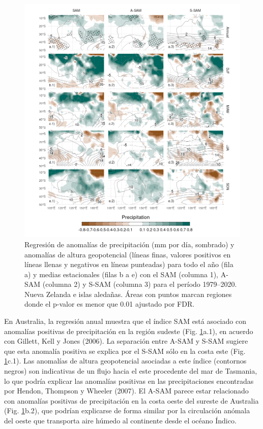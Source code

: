 \documentclass[12pt,oneside,a4paper]{reedthesis}
\begin{document}
\begin{figure}

{\centering \includegraphics{figures/30-sam/pp-regr-oceania-1} 

}

\caption{Regresión de anomalías de precipitación (mm por día, sombrado) y anomalías de altura geopotencial (líneas finas, valores positivos en líneas llenas y negativos en líneas punteadas) para todo el año (fila a) y medias estacionales (filas b a e) con el SAM (columna 1), A-SAM (columna 2) y S-SAM (columna 3) para el período 1979--2020. Nueva Zelanda e islas aledañas. Áreas con puntos marcan regiones donde el p-valor es menor que 0.01 ajustado por FDR.}\label{fig:pp-regr-oceania}
\end{figure}

En Australia, la regresión anual muestra que el índice SAM está asociado con anomalías positivas de precipitación en la región sudeste (Fig. \ref{fig:pp-regr-oceania}a.1), en acuerdo con Gillett, Kell y Jones (2006).
La separación entre A-SAM y S-SAM sugiere que esta anomalía positiva se explica por el S-SAM sólo en la costa este (Fig. \ref{fig:pp-regr-oceania}c.1).
Las anomalías de altura geopotencial asociadas a este índice (contornos negros) son indicativas de un flujo hacia el este procedente del mar de Tasmania, lo que podría explicar las anomalías positivas en las precipitaciones encontradas por Hendon, Thompson y Wheeler (2007).
El A-SAM parece estar relacionado con anomalías positivas de precipitación en la costa oeste del sureste de Australia (Fig. \ref{fig:pp-regr-oceania}b.2), que podrían explicarse de forma similar por la circulación anómala del oeste que transporta aire húmedo al continente desde el océano Índico.
\end{document}
